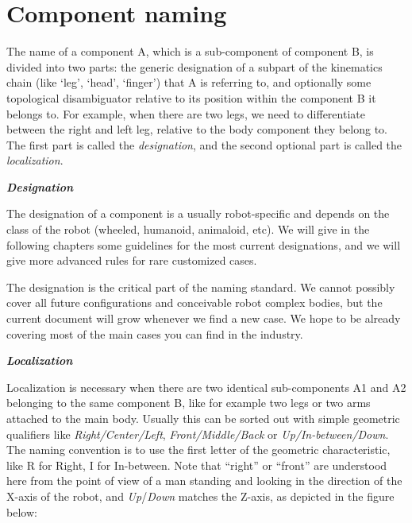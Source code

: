 \documentclass[a4paper]{article}
\begin{document}
\section[Component naming]{ Component naming}
{
\textsf{The name of a component A, which is a sub-component of component
B, is divided into two parts: the generic designation of a subpart of
the kinematics chain (like ‘leg’, ‘head’, ‘finger’) that A is referring
to, and optionally some topological disambiguator relative to its
position within the component B it belongs to. For example, when there
are two legs, we need to differentiate between the right and left leg,
relative to the body component they belong to. The first part is called
the }\textsf{\textit{designation}}\textsf{, and the second optional
part is called the }\textsf{\textit{localization}}\textsf{.}}

{\sffamily\bfseries\itshape
Designation}

{\sffamily
The designation of a component is a usually robot-specific and depends
on the class of the robot (wheeled, humanoid, animaloid, etc). We will
give in the following chapters some guidelines for the most current
designations, and we will give more advanced rules for rare customized
cases. }

{\sffamily
The designation is the critical part of the naming standard. We cannot
possibly cover all future configurations and conceivable robot complex
bodies, but the current document will grow whenever we find a new case.
We hope to be already covering most of the main cases you can find in
the industry.}

{\sffamily\bfseries\itshape
Localization }

{
\textsf{Localization is necessary when there are two identical
sub-components A1 and A2 belonging to the same component B, like for
example two legs or two arms attached to the main body. Usually this
can be sorted out with simple geometric qualifiers like
}\textsf{\textit{Right/Center/Left}}\textsf{,
}\textsf{\textit{Front/Middle/Back}}\textsf{ or
}\textsf{\textit{Up}}\textsf{\textit{/In-between/Down}}\textsf{. The
naming convention is to use the first letter of the geometric
characteristic, like }R\textsf{ for Right, }I\textsf{ for In-between.
Note that “right” or “front” are understood here from the point of view
of a man standing and looking in the direction of the X-axis of the
robot, and
}\textsf{\textit{Up}}\textsf{/}\textsf{\textit{Down}}\textsf{ matches
the Z-axis, as depicted in the figure below:}}
\end{document}
